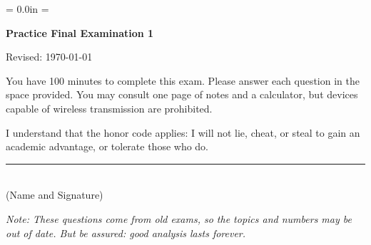 \documentclass[letterpaper,12pt]{exam}
\def\HeadName{Practice Final Examination 1}
\begin{document}
\parindent = 0.0in
\parskip = \bigskipamount
\thispagestyle{empty}%
\Head

\centerline{\large \bf \HeadName}%
\centerline{Revised:  \today}

\bigskip
You have 100 minutes to complete this exam.  Please answer each
question in the space provided. You may consult one page of notes
and a calculator, but devices capable of wireless transmission are
prohibited.

I understand that the honor code applies: I will not lie, cheat,
or steal to gain an academic advantage, or tolerate those who do.

\begin{flushright}
\rule{4in}{0.5pt} \\ (Name and Signature)
\end{flushright}

{\it Note:  These questions come from old exams,
so the topics and numbers may be out of date.
But be assured:  good analysis lasts forever.}  
\end{document}
